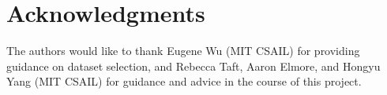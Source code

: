 \section{Acknowledgments}
The authors would like to thank Eugene Wu (MIT CSAIL) for providing guidance on dataset selection, and Rebecca Taft, Aaron Elmore, and Hongyu Yang (MIT CSAIL) for guidance and advice in the course of this project.
